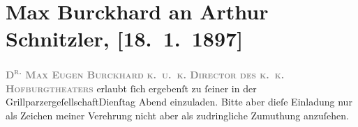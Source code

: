 

         
         \renewcommand{\erwaehntePersonen}{Personen: Max Eugen Burckhard}
         \renewcommand{\erwaehnteInstitutionen}{Institutionen: Grillparzer-Gesellschaft}
         \renewcommand{\erwaehnteOrte}{Orte: Burgtheater, Wien}
         \renewcommand{\erwaehnteWerke}{}
               \section[Max Burckhard an Arthur Schnitzler, {[}18. 1. 1897{]}]{ Max Burckhard an Arthur Schnitzler, {[}18. 1. 1897{]}}\nopagebreak{}\rehead{ }\begin{ledgroupsized}[t]{13cm}\normalsize\beginnumbering{} \toendnotes[C]{\smallbreak\pagebreak[2]} 
\toendnotes[C]{\smallbreak}\pstart
           \noindent{}\centering{}{\pb}\textcolor{gray}{\textbf{\textsc{D\textsuperscript{r.} Max Eugen Burckhard}}}\pend
           \pstart
           \noindent{}\centering{}\textcolor{gray}{\textbf{\textsc{k. u. k. Director des k. k. Hofburgtheaters}}}\pend
           \pstart
           erlaubt ſich ergebenſt zu ſeiner \label{K_L00641-1v}\label{K_L00641-1h} in der GrillparzergeſellschaftDienſtag Abend einzuladen. Bitte aber dieſe Einladung nur als Zeichen
               meiner Verehrung nicht aber als zudringliche Zumuthung anzuſehen.\pend
           
         
         \endnumbering{}\end{ledgroupsized}  \newcommand{\dateiname}{L00641}\newcommand{\titel}{Max Burckhard an Arthur Schnitzler, [18. 1. 1897]}\newcommand{\editorInnen}{Martin Anton Müller und Gerd-Hermann Susen}
      